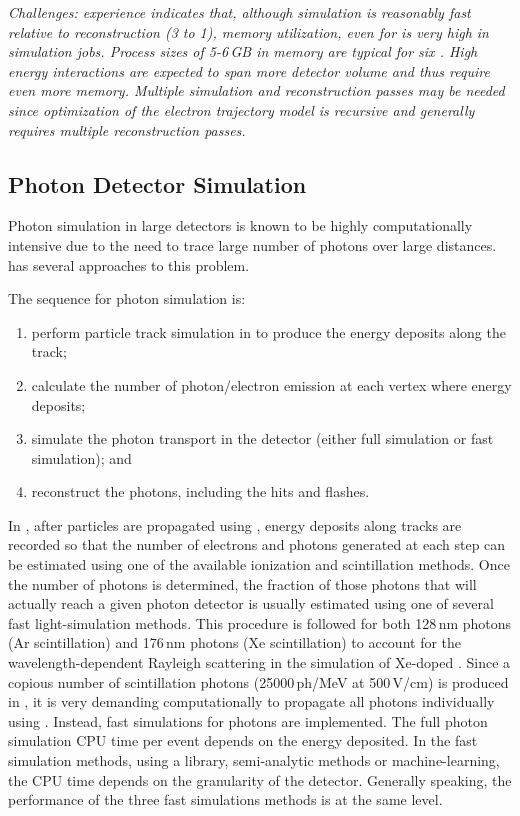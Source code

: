 \documentclass[../main-v1.tex]{subfiles}
\begin{document}
{\it Challenges:  
 experience indicates that, although simulation is reasonably fast relative to reconstruction (3 to 1), memory utilization, even for  %
is very high in simulation jobs.  Process sizes of 5-6\,GB in memory are typical for six .  High energy  interactions are expected to span more detector volume and thus require even more memory. Multiple %
simulation and reconstruction passes may be needed since optimization of the electron trajectory model is recursive and generally requires multiple reconstruction passes. }

\subsection{Photon Detector Simulation }

Photon simulation in large detectors is known to be highly computationally intensive due to the need to trace large number of photons over large distances.   has several approaches to this problem. 

The sequence for photon simulation is:
\begin{enumerate}
\item perform particle track simulation in  to produce the energy deposits along the track;
\item  calculate the number of photon/electron emission at each vertex where energy deposits; \item 
simulate the photon transport in the detector (either full simulation or fast simulation); and
\item  reconstruct the photons, including the hits and flashes.
\end{enumerate}
 
In , after particles are propagated using , energy deposits along tracks are recorded so that the number of electrons and photons generated at each step can be estimated using one of the available  ionization and scintillation methods. Once the number of photons is determined, the fraction of those photons that will actually reach a given photon detector is usually estimated using one of several fast light-simulation methods. This procedure is followed for both 128\,nm photons (Ar scintillation) and 176\,nm photons (Xe scintillation) to account for the wavelength-dependent Rayleigh scattering in the simulation of Xe-doped . 
Since a copious number of scintillation photons (25000\,ph/MeV at 500\,V/cm) is produced in , it is very demanding computationally to propagate all photons individually using . Instead,  fast simulations for photons are implemented.
The full   photon simulation CPU time per event depends on the energy deposited. 
In the fast simulation methods, using a library,  semi-analytic methods or machine-learning, the CPU time depends on the granularity of the detector. Generally speaking, the performance of the three fast simulations methods is at the same level. 
 
\end{document}
